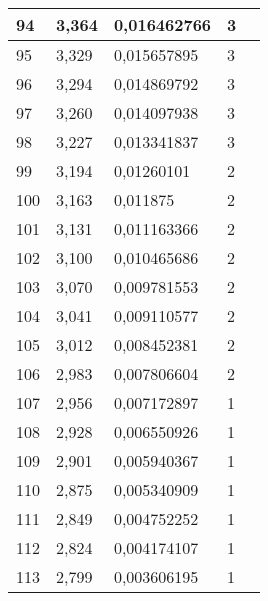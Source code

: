 \begin{table}[H]
\begin{tabular}{|l|l|l|l|l|}
94         & 3,364          & 0,016462766     & 3                   &           \\ \hline
95         & 3,329          & 0,015657895     & 3                   &           \\ \hline
96         & 3,294          & 0,014869792     & 3                   &           \\ \hline
97         & 3,260          & 0,014097938     & 3                   &           \\ \hline
98         & 3,227          & 0,013341837     & 3                   &           \\ \hline
99         & 3,194          & 0,01260101      & 2                   &           \\ \hline
100        & 3,163          & 0,011875        & 2                   &           \\ \hline
101        & 3,131          & 0,011163366     & 2                   &           \\ \hline
102        & 3,100          & 0,010465686     & 2                   &           \\ \hline
103        & 3,070          & 0,009781553     & 2                   &           \\ \hline
104        & 3,041          & 0,009110577     & 2                   &           \\ \hline
105        & 3,012          & 0,008452381     & 2                   &           \\ \hline
106        & 2,983          & 0,007806604     & 2                   &           \\ \hline
107        & 2,956          & 0,007172897     & 1                   &           \\ \hline
108        & 2,928          & 0,006550926     & 1                   &           \\ \hline
109        & 2,901          & 0,005940367     & 1                   &           \\ \hline
110        & 2,875          & 0,005340909     & 1                   &           \\ \hline
111        & 2,849          & 0,004752252     & 1                   &           \\ \hline
112        & 2,824          & 0,004174107     & 1                   &           \\ \hline
113        & 2,799          & 0,003606195     & 1                   &           \\ \hline

\end{tabular}
\end{table}
